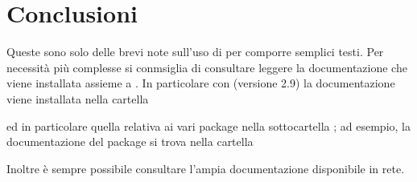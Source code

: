 
\section{Conclusioni}

Queste sono solo delle brevi note sull'uso di \ltx per comporre semplici testi.
Per necessità più complesse si conmsiglia di consultare leggere la documentazione che viene installata assieme a \ltx.
In particolare con \mik (versione 2.9) la documentazione viene installata nella cartella
\begin{center}
\end{center}
ed in particolare quella relativa ai vari package nella sottocartella ; ad esempio, la documentazione del package  si trova nella cartella
\begin{center}
\end{center}
Inoltre è sempre possibile consultare l'ampia documentazione disponibile in rete.
